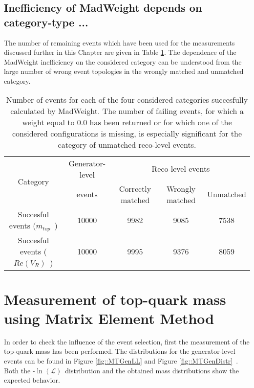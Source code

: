 \documentclass[a4paper,10pt]{article}
\newcommand{\NegLL}{-$\ln(\mathcal{L})$~}
\newcommand{\RVR}{$Re(V_R)$~}
\newcommand{\mTop}{$m_{top}$~}
\begin{document}
\subsection{Inefficiency of MadWeight depends on category-type ...}
The number of remaining events which have been used for the measurements discussed further in this Chapter are given in Table \ref{table::MWEff}. The dependence of the MadWeight inefficiency on the considered category can be understood from the large number of wrong event topologies in the wrongly matched and unmatched category.

\begin{table}[h!t]
 \caption{Number of events for each of the four considered categories succesfully calculated by MadWeight. The number of failing events, for which a weight equal to $0.0$ has been returned or for which one of the considered configurations is missing, is especially significant for the category of unmatched reco-level events.}
 \label{table::MWEff}
 \begin{tabular}{c|c|c|c|c}
  \multirow{2}{*}{Category}	& Generator-level 	& \multicolumn{3}{c}{Reco-level events} 			\\
				& events 		& Correctly matched	& Wrongly matched 	& Unmatched 	\\
  \hline
  Succesful events (\mTop)	& 10000 		& 9982 			& 9085			& 7538 		\\
  Succesful events (\RVR) 	& 10000 		& 9995 			& 9376 			& 8059
 \end{tabular}
\end{table}

\section[Measurement of $m_{top}$ using MEM]{Measurement of top-quark mass using Matrix Element Method}
In order to check the influence of the event selection, first the measurement of the top-quark mass has been performed.
The distributions for the generator-level events can be found in Figure \ref{fig::MTGenLL} and Figure \ref{fig::MTGenDistr}~.
Both the \NegLL distribution and the obtained mass distributions show the expected behavior.
\end{document}
